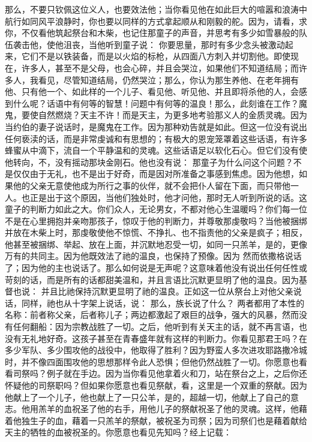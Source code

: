 那么，不要只钦佩这位义人，也要效法他；当你看见他在如此巨大的喧嚣和浪涛中航行如同风平浪静时，你也要以同样的方式拿起顺从和刚毅的舵。因为，请看，求你，不仅看他筑起祭台和木柴，也记住那童子的声音，并思考有多少如雪暴般的队伍袭击他，使他沮丧，当他听到童子说： 你要思量，那时有多少念头被激动起来，它们不是以铁装备，而是以火焰的标枪，从四面八方刺入并切割他。即使现在，许多人，甚至不是父母，也会心碎，并且会哭泣，如果他们不知道结局；而许多人，我看见，尽管知道结局，仍然哭泣；那么，你认为那生养他、在老年拥有他、只有他一个、如此样的一个儿子、看见他、听见他、并且即将杀他的人，会感到什么呢？话语中有何等的智慧！问题中有何等的温良！那么，此刻谁在工作？魔鬼，要使自然燃烧？天主不许！而是天主，为更多地考验那义人的金质灵魂。因为当约伯的妻子说话时，是魔鬼在工作。因为那种劝告就是如此。但这一位没有说出任何亵渎的话，而是非常虔诚和有思想的；有极大的恩宠笼罩着这些话语，有许多蜂蜜从中滴下，流自一个平静温和的灵魂。这些话语足以软化石心。但它们没有使他转向，不，没有摇动那块金刚石。他也没有说： 那童子为什么问这个问题？不是仅仅由于无礼，也不是出于好奇，而是因对所准备之事感到焦虑。因为他想，如果他的父亲无意使他成为所行之事的伙伴，就不会把仆人留在下面，而只带他一人。也正是出于这个原因，当他们独处时，他才问他，那时无人听到所说的话。这童子的判断力如此之大。你们众人，无论男女，不都对他心生温暖吗？你们每一位不是在心里拥抱并亲吻那孩子，惊叹于他的判断力，并尊敬那虔敬吗？当他被捆绑并放在木柴上时，那虔敬使他不惊慌、不挣扎、也不指责他的父亲是疯子；相反，他甚至被捆绑、举起、放在上面，并沉默地忍受一切，如同一只羔羊，是的，更像万有的共同主。因为他既效法了祂的温良，也保持了预像。因为  然而依撒格说话了；因为他的主也说话了。那么如何说是无声呢？这意味着他没有说出任何任性或苛刻的话，而是所有的话都甜美温和，并且言语比沉默更显明了他的温良。因为基督也说：  并且比祂保持沉默更显明了祂的温良。正如这一位从祭台上对他父亲说话，同样，祂也从十字架上说话，说： 那么，族长说了什么？  两者都用了本性的名称：前者称父亲，后者称儿子；两边都激起了艰巨的战争，强大的风暴，然而没有任何翻船：因为宗教战胜了一切。之后，他听到有关天主的话，就不再言语，也没有无礼地好奇。这孩子甚至在青春盛年就有这样的判断力。你看见那君王吗？在多少军队、多少围攻他的战役中，他取得了胜利？因为野蛮人多次进攻耶路撒冷城时，并不像四面围攻他的思想那样令此人恐惧；但他仍然战胜了一切。你愿意也看看司祭吗？例子就在手边。因为当你看见他拿着火和刀，站在祭台之上，之后你还怀疑他的司祭职吗？但如果你愿意也看见祭献，看，这里是一个双重的祭献。因为他献上了一个儿子，他也献上了一只公羊，是的，超越一切，他献上了自己的意志。他用羔羊的血祝圣了他的右手，用他儿子的祭献祝圣了他的灵魂。这样，他藉着他独生子的血，藉着一只羔羊的祭献，被祝圣为司祭；因为司祭们也是藉着献给天主的牺牲的血被祝圣的。你愿意也看见先知吗？经上记载： \par

